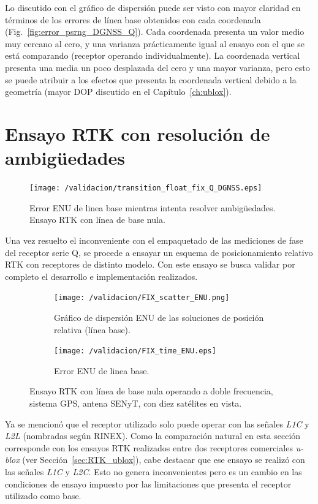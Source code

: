 \documentclass[a4paper,12pt,oneside,onecolumn,final,openright]{book}%
\begin{document}
	Lo discutido con el gráfico de dispersión puede ser visto con mayor claridad en términos de los errores de línea base obtenidos con cada coordenada (Fig.~\ref{fig:error_psrng_DGNSS_Q}). Cada coordenada presenta un valor medio muy cercano al cero, y una varianza prácticamente igual al ensayo con el que se está comparando (receptor operando individualmente). La coordenada vertical presenta una media un poco desplazada del cero y una mayor varianza, pero esto se puede atribuir a los efectos que presenta la coordenada vertical debido a la geometría (mayor DOP discutido en el Capítulo~\ref{ch:ublox}).
\section{Ensayo RTK con resolución de ambigüedades}
\begin{figure}[t]
\centering
 	\texttt{[image: /validacion/transition\_float\_fix\_Q\_DGNSS.eps]}
 	\caption{Error ENU de linea base mientras intenta resolver ambigüedades. Ensayo RTK con línea de base nula.}
  	\label{fig:trans_float_fix_DGNSS_Q}
\end{figure}
	Una vez resuelto el inconveniente con el empaquetado de las mediciones de fase del receptor serie Q, se procede a ensayar un esquema de posicionamiento relativo RTK con receptores de distinto modelo. Con este ensayo se busca validar por completo el desarrollo e implementación realizados.
\begin{figure}
\begin{subfigure}{1\linewidth}
\centering
  	\texttt{[image: /validacion/FIX\_scatter\_ENU.png]}
  	\caption{Gráfico de dispersión ENU de las soluciones de posición relativa (línea base).}
    \label{fig:scatter_fix_DGNSS_Q}
\end{subfigure}

\begin{subfigure}{1\linewidth}
\centering
 	\texttt{[image: /validacion/FIX\_time\_ENU.eps]}
 	\caption{Error ENU de linea base.}
  	\label{fig:error_fix_DGNSS_Q}
\end{subfigure}
\caption{Ensayo RTK con línea de base nula operando a doble frecuencia, sistema GPS, antena SENyT, con diez satélites en vista.}
\label{fig:ensayoDGNSS_fix_Q}
\end{figure}
	
	Ya se mencionó que el receptor utilizado solo puede operar con las señales \textit{L1C} y \textit{L2L} (nombradas según RINEX). Como la comparación natural en esta sección corresponde con los ensayos RTK realizados entre dos receptores comerciales \textit{u-blox} (ver Sección~\ref{sec:RTK_ublox}), cabe destacar que ese ensayo se realizó con las señales \textit{L1C} y \textit{L2C}. Esto no genera inconvenientes pero es un cambio en las condiciones de ensayo impuesto por las limitaciones que presenta el receptor utilizado como base.
	
\end{document}
